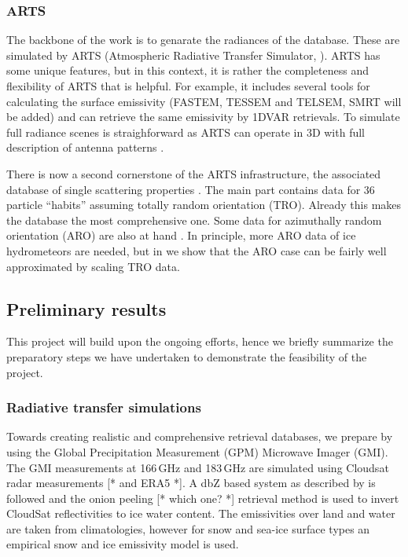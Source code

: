 \documentclass[12pt,oneside,a4paper]{article}
\newcommand\intodo[1]{{\color{red} [* #1 *]}}
\begin{document}
\subsubsection{ARTS}
\label{sec:arts}
% 
The backbone of the work is to genarate the radiances of the database. These
are simulated by ARTS (Atmospheric Radiative Transfer Simulator,
\citet{eriksson:arts2:11}). ARTS has some unique features, but in this context,
it is rather the completeness and flexibility of ARTS that is helpful. For
example, it includes several tools for calculating the surface emissivity
(FASTEM, TESSEM and TELSEM, SMRT will be added) and can retrieve the same
emissivity by 1DVAR retrievals. To simulate full radiance scenes is
straighforward as ARTS can operate in 3D with full description of antenna
patterns \citep{duncan:anexp:19}.

There is now a second cornerstone of the ARTS infrastructure, the associated
database of single scattering properties \citep{eriksson:agene:18}. The main
part contains data for 36 particle ``habits'' assuming totally random
orientation (TRO). Already this makes the database the most comprehensive one.
Some data for azimuthally random orientation (ARO) are also at hand
\citep{brath:micro:20,ekelund:micro:20}. In principle, more ARO data of ice
hydrometeors are needed, but in \citet{baralakas:intro:21} we show that the ARO
case can be fairly well approximated by scaling TRO data.


\subsection{Preliminary results}
%
This project will build upon the ongoing efforts, hence we briefly summarize
the preparatory steps we have undertaken to demonstrate the feasibility of the
project.

\subsubsection{Radiative transfer simulations}
%
\label{sec:radiative_transfer}
Towards creating realistic and comprehensive retrieval databases, we prepare by
using the Global Precipitation Measurement (GPM) Microwave Imager (GMI). The
GMI measurements at 166\,GHz and 183\,GHz are simulated using Cloudsat radar
measurements \intodo{and ERA5}. A dbZ based system as described by \citet{ekelund:using:20} is
followed and the onion peeling \intodo{which one?} retrieval method is used to invert CloudSat
reflectivities to ice water content. The emissivities over land and water are
taken from climatologies, however for snow and sea-ice surface types an
empirical snow and ice emissivity model is used.
\end{document}
